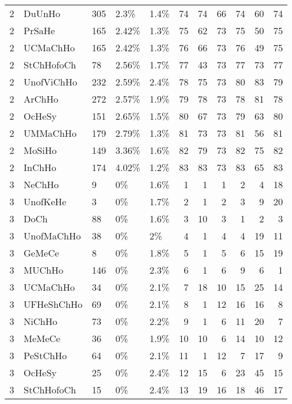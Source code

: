 \begin{longtable}{lllllrrrrrr}
  2 & DuUnHo & 305 & 2.3\% & 1.4\% &  74 &  74 &  66 &  74 &  60 &  74 \\ 
  2 & PrSaHe & 165 & 2.42\% & 1.3\% &  75 &  62 &  73 &  75 &  50 &  75 \\ 
  2 & UCMaChHo & 165 & 2.42\% & 1.3\% &  76 &  66 &  73 &  76 &  49 &  75 \\ 
  2 & StChHofoCh & 78 & 2.56\% & 1.7\% &  77 &  43 &  73 &  77 &  73 &  77 \\ 
  2 & UnofViChHo & 232 & 2.59\% & 2.4\% &  78 &  75 &  73 &  80 &  83 &  79 \\ 
  2 & ArChHo & 272 & 2.57\% & 1.9\% &  79 &  78 &  73 &  78 &  81 &  78 \\ 
  2 & OcHeSy & 151 & 2.65\% & 1.5\% &  80 &  67 &  73 &  79 &  63 &  80 \\ 
  2 & UMMaChHo & 179 & 2.79\% & 1.3\% &  81 &  73 &  73 &  81 &  56 &  81 \\ 
  2 & MoSiHo & 149 & 3.36\% & 1.6\% &  82 &  79 &  73 &  82 &  75 &  82 \\ 
  2 & InChHo & 174 & 4.02\% & 1.2\% &  83 &  83 &  73 &  83 &  65 &  83 \\ 
  3 & NeChHo & 9 & 0\% & 1.6\% &   1 &   1 &   1 &   2 &   4 &  18 \\ 
  3 & UnofKeHe & 3 & 0\% & 1.7\% &   2 &   1 &   2 &   3 &   9 &  20 \\ 
  3 & DoCh & 88 & 0\% & 1.6\% &   3 &  10 &   3 &   1 &   2 &   3 \\ 
  3 & UnofMaChHo & 38 & 0\% & 2\% &   4 &   1 &   4 &   4 &  19 &  11 \\ 
  3 & GeMeCe & 8 & 0\% & 1.8\% &   5 &   1 &   5 &   6 &  15 &  19 \\ 
  3 & MUChHo & 146 & 0\% & 2.3\% &   6 &   1 &   6 &   9 &   6 &   1 \\ 
  3 & UCMaChHo & 34 & 0\% & 2.1\% &   7 &  18 &  10 &  15 &  25 &  14 \\ 
  3 & UFHeShChHo & 69 & 0\% & 2.1\% &   8 &   1 &  12 &  16 &  16 &   8 \\ 
  3 & NiChHo & 73 & 0\% & 2.2\% &   9 &   1 &   6 &  11 &  20 &   7 \\ 
  3 & MeMeCe & 36 & 0\% & 1.9\% &  10 &  10 &   6 &  14 &  10 &  12 \\ 
  3 & PeStChHo & 64 & 0\% & 2.1\% &  11 &   1 &  12 &   7 &  17 &   9 \\ 
  3 & OcHeSy & 25 & 0\% & 2.4\% &  12 &  15 &   6 &  23 &  45 &  15 \\ 
  3 & StChHofoCh & 15 & 0\% & 2.4\% &  13 &  19 &  16 &  18 &  46 &  17 \\ 

\end{longtable}

